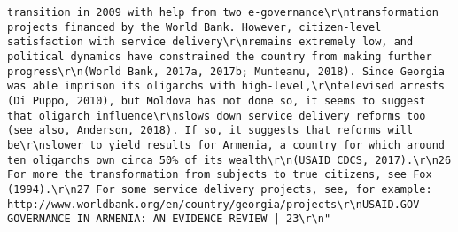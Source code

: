 \documentclass[
]{article}
\begin{document}
\begin{verbatim}
transition in 2009 with help from two e-governance\r\ntransformation projects financed by the World Bank. However, citizen-level satisfaction with service delivery\r\nremains extremely low, and political dynamics have constrained the country from making further progress\r\n(World Bank, 2017a, 2017b; Munteanu, 2018). Since Georgia was able imprison its oligarchs with high-level,\r\ntelevised arrests (Di Puppo, 2010), but Moldova has not done so, it seems to suggest that oligarch influence\r\nslows down service delivery reforms too (see also, Anderson, 2018). If so, it suggests that reforms will be\r\nslower to yield results for Armenia, a country for which around ten oligarchs own circa 50% of its wealth\r\n(USAID CDCS, 2017).\r\n26 For more the transformation from subjects to true citizens, see Fox (1994).\r\n27 For some service delivery projects, see, for example: http://www.worldbank.org/en/country/georgia/projects\r\nUSAID.GOV                                                           GOVERNANCE IN ARMENIA: AN EVIDENCE REVIEW | 23\r\n"                                                                                                                                                                                                                                                                                                                                                                                                                                                                                                                                                                                                                                                                                              

\end{verbatim}
\end{document}
